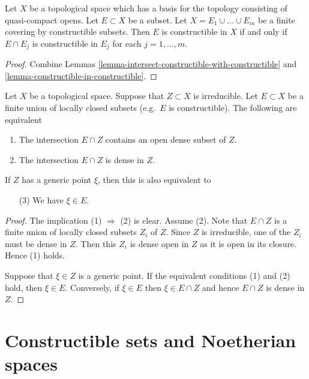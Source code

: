 \begin{lemma}
\label{lemma-collate-constructible-from-constructible}
Let $X$ be a topological space which has a basis for the topology
consisting of quasi-compact opens. Let $E \subset X$ be a subset.
Let $X = E_1 \cup \ldots \cup E_m$ be a finite covering by constructible
subsets. Then $E$ is constructible in $X$ if and only if $E \cap E_j$
is constructible in $E_j$ for each $j = 1, \ldots, m$.
\end{lemma}

\begin{proof}
Combine
Lemmas \ref{lemma-intersect-constructible-with-constructible} and
\ref{lemma-constructible-in-constructible}.
\end{proof}

\begin{lemma}
\label{lemma-generic-point-in-constructible}
Let $X$ be a topological space. Suppose that
$Z \subset X$ is irreducible. Let $E \subset X$
be a finite union of locally closed subsets (e.g.\ $E$
is constructible). The following are equivalent
\begin{enumerate}
\item The intersection $E \cap Z$ contains an open
dense subset of $Z$.
\item The intersection $E \cap Z$ is dense in $Z$.
\end{enumerate}
If $Z$ has a generic point $\xi$, then this is
also equivalent to
\begin{enumerate}
\item[(3)] We have $\xi \in E$.
\end{enumerate}
\end{lemma}

\begin{proof}
The implication (1) $\Rightarrow$ (2) is clear. Assume (2).
Note that $E \cap Z$ is a finite union of locally closed subsets
$Z_i$ of $Z$. Since $Z$ is irreducible, one of the $Z_i$ must
be dense in $Z$. Then this $Z_i$ is dense open in $Z$ as it is
open in its closure. Hence (1) holds.

\medskip\noindent
Suppose that $\xi \in Z$ is a generic point. If the equivalent conditions
(1) and (2) hold, then $\xi \in E$. Conversely, if $\xi \in E$ then
$\xi \in E \cap Z$ and hence $E \cap Z$ is dense in $Z$.
\end{proof}







\section{Constructible sets and Noetherian spaces}
\label{section-constructible-Noetherian}

